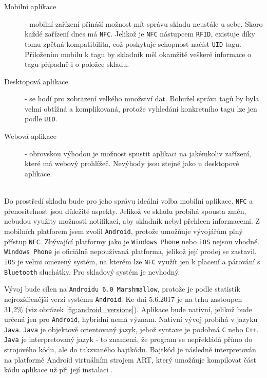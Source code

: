 \documentclass[czech,BP]{thesiskiv}
\begin{document}
			\begin{description}	
				\item [Mobilní aplikace] - mobilní zařízení přináší možnost mít správu skladu neustále u sebe.
				Skoro každé zařízení dnes má \texttt{NFC}. Jelikož je \texttt{NFC} nástupcem \texttt{RFID}, existuje díky tomu zpětná kompatibilita,
			což poskytuje schopnost načíst \texttt{UID} tagu. Přiložením mobilu k tagu by skladník měl okamžitě veškeré informace o tagu případně i o položce skladu.
				
				\item [Desktopová aplikace] - se hodí pro zobrazení velkého množství dat. Bohužel správa tagů by byla velmi obtížná a komplikovaná, protože vyhledání konkretního tagu lze jen podle \texttt{UID}. 	
				\item [Webová aplikace] - obrovskou výhodou je možnost spustit aplikaci na jakémkoliv zařízení, které má webový prohlížeč. Nevýhody jsou stejné jako u desktopové aplikace.								
			\end{description}
			\ \\
			Do prostředí skladu bude pro jeho správu ideální volba mobilní aplikace. \texttt{NFC} a přenositelnost jsou důležité aspekty.
			Jelikož ve skladu probíhá spousta změn, nebudou využity možnosti notifikací, aby skladník nebyl přehlcen informacemi. Z mobilních platforem jsem zvolil \texttt{Android}, protože umožňuje vývojářům plný přístup \texttt{NFC}. 						
			Zbývající platformy jako je \texttt{Windows Phone} nebo \texttt{iOS} nejsou vhodné. 
			 \texttt{Windows Phone} je oficiálně nepoužívaná platforma, jelikož její prodej se zastavil. \texttt{iOS} je velmi omezený systém, na kterém lze \texttt{NFC} využít jen k placení a párování s \texttt{Bluetooth} sluchátky. Pro skladový systém je nevhodný. 
 
 			Vývoj bude cílen na \texttt{Androidu 6.0 Marshmallow}, protože je podle statistik nejrozšířenější verzí systému \texttt{Android}. Ke dni 5.6.2017 je na trhu zastoupen 31,2\% (viz obrázek \ref{fig:android_versions}).  
			Aplikace bude nativní, jelikož bude určená jen pro \texttt{Android}, hybridní nemá význam. Nativní vývoj probíhá v jazyku \texttt{Java}. \texttt{Java} je objektově orientovaný jazyk, jehož syntaxe je podobná \texttt{C} nebo \texttt{C++}. \texttt{Java} je interpretovaný jazyk - to znamená, že program se nepřekládá přímo do strojového kódu, ale do takzvaného bajtkódu. Bajtkód je následně interpretován na platformě Android virtuálním strojem ART, který umožňuje kompilovat část kódu aplikace už při její instalaci \cite{lacko2017vyvoj}.	
					
\end{document}
